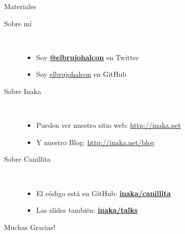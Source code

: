 \documentclass[utf8,hyperref={colorlinks=true}]{beamer}
\begin{document}
\begin{frame}{Materiales}
	\begin{description}
		\item[Sobre m\'i]~\\
			\begin{itemize}
				\item Soy \textbf{\href{http://twitter.com/elbrujohalcon}{@elbrujohalcon}} en Twitter
				\item Soy \href{http://github.com/elbrujohalcon}{elbrujohalcon} en GitHub
			\end{itemize}
		\item[Sobre Inaka]~\\
			\begin{itemize}
				\item Pueden ver nuestro sitio web: \href{http://inaka.net}{http://inaka.net}
				\item Y nuestro Blog: \href{http://inaka.net/blog}{http://inaka.net/blog}
			\end{itemize}
		\item[Sobre Canillita]~\\
			\begin{itemize}
				\item El c\'odigo est\'a en GitHub: \textbf{\href{https://github.com/inaka/canillita}{inaka/canillita}}
				\item Las slides tambi\'en: \textbf{\href{https://github.com/inaka/talks}{inaka/talks}}
			\end{itemize}
	\end{description}
\end{frame}

\begin{frame}
	\begin{center}
		{\Huge Muchas Gracias!}
	\end{center}
\end{frame}
\end{document}
